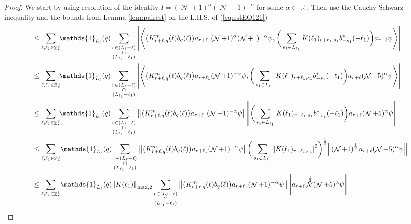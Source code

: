 \documentclass[sn-mathphys, Numbered ,a4paper]{sn-jnl}%
\DeclareMathOperator{\R}{\mathbb{R}}
\DeclareMathOperator{\Z}{\mathbb{Z}}
\DeclareMathOperator{\NN}{\mathcal{N}}
\newcommand{\half}{\frac{1}{2}}
\newcommand{\eva}[1]{\left\langle #1 \right\rangle}
\theoremstyle{plain}
\theoremstyle{definition}
\theoremstyle{remark}
\theoremstyle{plain}
\theoremstyle{definition}
\theoremstyle{remark}
\begin{document}
\begin{proof}
	We start by using resolution of the identity $I = (\NN+1)^{\alpha}(\NN+1)^{-\alpha}$ for some $\alpha \in \R$. Then use the Cauchy-Schwarz inequality and the bounds from Lemma \ref{lem:pairest} on the L.H.S. of (\ref{eq:estEQ121})
	\begin{align}
		&\leq \sum\limits_{\ell,\ell_1 \in \Z^3_*}\!\! \mathds{1}_{L_\ell}(q) \sum\limits_{\substack{r \in (L_\ell-\ell) \\ \cap \\ (L_{\ell_1}-\ell_1)}}\abs{\eva{\big(K^{m}_{r+\ell,q}(\ell)b_{q}(\ell)\big) a_{r+\ell_1}(\NN+1)^{\alpha}(\NN+1)^{-\alpha} \psi, \bigg( \sum\limits_{s_1 \in L_{\ell_1}} K(\ell_1)_{r+\ell_1,s_1}b^*_{-s_1}(-\ell_1) \bigg) a_{r+\ell} \psi }}\nonumber\\
		&\leq \sum\limits_{\ell,\ell_1 \in \Z^3_*} \!\!\mathds{1}_{L_\ell}(q) \sum\limits_{\substack{r \in (L_\ell-\ell) \\ \cap \\ (L_{\ell_1}-\ell_1)}}\abs{\eva{\big(K^{m}_{r+\ell,q}(\ell)b_{q}(\ell)\big) a_{r+\ell_1}(\NN+1)^{-\alpha} \psi, \bigg( \sum\limits_{s_1 \in L_{\ell_1}} K(\ell_1)_{r+\ell_1,s_1}b^*_{-s_1}(-\ell_1) \bigg) a_{r+\ell}(\NN+5)^{\alpha} \psi }}\nonumber\\
		&\leq \sum\limits_{\ell,\ell_1 \in \Z^3_*} \!\!\mathds{1}_{L_\ell}(q) \sum\limits_{\substack{r \in (L_\ell-\ell) \\ \cap \\ (L_{\ell_1}-\ell_1)}}\norm{\big(K^{m}_{r+\ell,q}(\ell)b_{q}(\ell)\big) a_{r+\ell_1} (\NN+1)^{-\alpha}\psi}\norm {\bigg( \sum\limits_{s_1 \in L_{\ell_1}} K(\ell_1)_{r+\ell_1,s_1}b^*_{-s_1}(-\ell_1) \bigg) a_{r+\ell} (\NN+5)^{\alpha}\psi }\nonumber\\
		&\leq \sum\limits_{\ell,\ell_1 \in \Z^3_*} \!\mathds{1}_{L_\ell}(q) \sum\limits_{\substack{r \in (L_\ell-\ell) \\ \cap \\ (L_{\ell_1}-\ell_1)}} \norm{\big(K^{m}_{r+\ell,q}(\ell)b_{q}(\ell)\big) a_{r+\ell_1} (\NN+1)^{-\alpha} \psi}\bigg( \sum\limits_{s_1 \in L_{\ell_1}} \abs{K(\ell_1)_{r+\ell_1,s_1}}^2 \bigg)^\half \norm {\left(\NN+1\right)^\half a_{r+\ell} (\NN+5)^{\alpha} \psi }\nonumber\\
		&\leq \sum\limits_{\ell,\ell_1 \in \Z^3_*} \!\mathds{1}_{L_\ell}(q) \norm{K(\ell_1)}_{\mathrm{max},2} \sum\limits_{\substack{r \in (L_\ell-\ell) \\ \cap \\ (L_{\ell_1}-\ell_1)}} \norm{\big(K^{m}_{r+\ell,q}(\ell)b_{q}(\ell)\big) a_{r+\ell_1} (\NN+1)^{-\alpha} \psi} \norm { a_{r+\ell}\NN^\half (\NN+5)^{\alpha} \psi }\nonumber\\

\end{align}
\end{proof}
\end{document}

